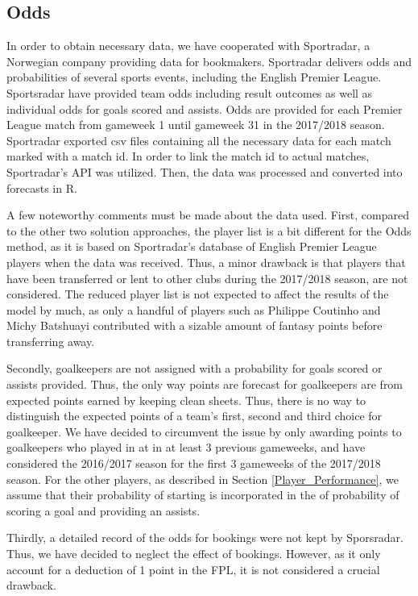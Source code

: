 \subsection{Odds}

In order to obtain necessary data, we have cooperated with Sportradar, a Norwegian company providing data for bookmakers. Sportradar delivers odds and probabilities of several sports events, including the English Premier League. Sportsradar have provided team odds including result outcomes as well as individual odds for goals scored and assists. Odds are provided for each Premier League match from gameweek 1 until gameweek 31 in the 2017/2018 season. Sportradar exported csv files containing all the necessary data for each match marked with a match id. In order to link the match id to actual matches, Sportradar's API was utilized. Then, the data was processed and converted into forecasts in R.

\newpar

A few noteworthy comments must be made about the data used. First, compared to the other two solution approaches, the player list is a bit different for the Odds method, as it is based on Sportradar's database of English Premier League players when the data was received. Thus, a minor drawback is that players that have been transferred or lent to other clubs during the 2017/2018 season, are not considered. The reduced player list is not expected to affect the results of the model by much, as only a handful of players such as Philippe Coutinho and Michy Batshuayi contributed with a sizable amount of fantasy points before transferring away. 

\newpar

Secondly, goalkeepers are not assigned with a probability for goals scored or assists provided. Thus, the only way points are forecast for goalkeepers are from expected points earned by keeping clean sheets. Thus, there is no way to distinguish the expected points of a team's first, second and third choice for goalkeeper. We have decided to circumvent the issue by only awarding points to goalkeepers who played in at in at least 3 previous gameweeks, and have considered the 2016/2017 season for the first 3 gameweeks of the 2017/2018 season. For the other players, as described in Section \ref{Player_Performance}, we assume that their probability of starting is incorporated in the of probability of scoring a goal and providing an assists.

\newpar

Thirdly, a detailed record of the odds for bookings were not kept by Sporsradar. Thus, we have decided to neglect the effect of bookings. However, as it only account for a deduction of 1 point in the FPL, it is not considered a crucial drawback.

